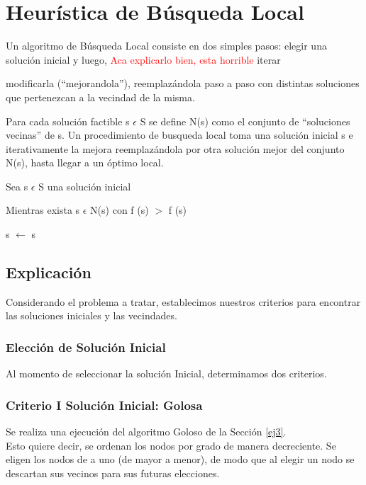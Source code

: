 \section{Heur\'istica de B\'usqueda Local} \label{ej4}

Un algoritmo de Búsqueda Local consiste en dos simples pasos: elegir una solución inicial y luego, \textcolor{red}{Aca explicarlo bien, esta horrible} iterar


modificarla (``mejorandola''), reemplazándola paso a paso con distintas soluciones que pertenezcan a la vecindad de la misma.


Para cada solución factible s $\epsilon$ S se define N(s) como el conjunto de
``soluciones vecinas'' de s. Un procedimiento de busqueda local toma una solución inicial s e iterativamente la mejora reemplazándola por otra solución mejor del conjunto N(s), hasta llegar a un óptimo local.

 Sea s $\epsilon$ S una solución inicial
 
 Mientras exista s $\epsilon$ N(s) con f (s) $>$ f (s)
 
 s $\leftarrow$ s


\subsection{Explicaci\'on}

Considerando el problema a tratar, establecimos nuestros criterios para encontrar las soluciones iniciales y las vecindades.\\


\subsubsection{Elección de Solución Inicial}

Al momento de seleccionar la solución Inicial, determinamos dos criterios.

\subsubsection*{Criterio I Solución Inicial: Golosa}

Se realiza una ejecución del algoritmo Goloso de la Sección \ref{ej3}.\\

Esto quiere decir, se ordenan los nodos por grado de manera decreciente. Se eligen los nodos de a uno (de mayor a menor), de modo que al elegir un nodo se descartan sus vecinos para sus futuras elecciones.

